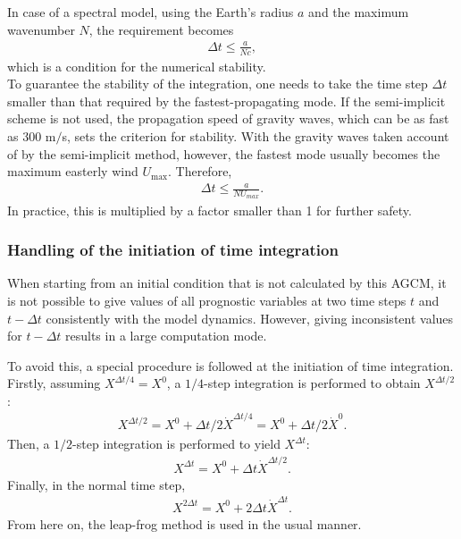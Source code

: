 In case of a spectral model, using the Earth's radius \(a\) and the
maximum wavenumber \(N\), the requirement becomes
\begin{eqnarray}
   \Delta t \le \frac{a}{N c},
\end{eqnarray}
which is a condition for the numerical stability.\\

To guarantee the stability of the integration, one needs to take the time step  \(\Delta t\) smaller than that required by the fastest-propagating mode.
If the semi-implicit scheme is not used, the propagation speed of gravity waves, which can be as fast as 300 m$/$s, sets the criterion for stability.
With the gravity waves taken account of by the semi-implicit method, however, the fastest mode usually becomes the maximum easterly wind $U_{\mathrm{max}}$. Therefore,
\begin{eqnarray}
   \Delta t \le \frac{a}{N U_{max}} .
\end{eqnarray}
In practice, this is multiplied by a factor smaller than 1 for further safety.

\hypertarget{handling-of-the-initiation-of-time-integration}{%
\subsubsection{Handling of the initiation of time
integration}\label{handling-of-the-initiation-of-time-integration}}

When starting from an initial condition that is not calculated by
this AGCM, it is not possible to give values of all prognostic variables at two time steps \(t\)
and \(t-\Delta t\) consistently with the model dynamics.
However, giving inconsistent values for \(t-\Delta t\) results in a large computation mode.

To avoid this, a special procedure is followed at the initiation of time integration.
Firstly, assuming \(X^{\Delta t/4} = X^0\), a \(1/4\)-step integration is performed to obtain $X^{\Delta t/2}$:
\begin{eqnarray}
  X^{\Delta t/2} = X^0 + \Delta t/2 \dot{X}^{\Delta t/4}
                 = X^0 + \Delta t/2 \dot{X}^0.
\end{eqnarray}
Then, a \(1/2\)-step integration is performed to yield $X^{\Delta t}$:
\begin{eqnarray}
  X^{\Delta t}   = X^0 + \Delta t \dot{X}^{\Delta t/2}.
\end{eqnarray}
Finally, in the normal time step,
\begin{eqnarray}
  X^{2\Delta t}   = X^0 + 2 \Delta t \dot{X}^{\Delta t}.
\end{eqnarray}
From here on, the leap-frog method is used in the usual manner.
